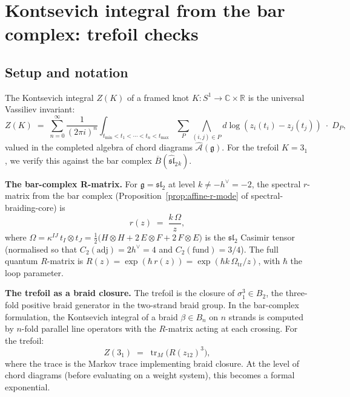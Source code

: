 \documentclass[11pt]{article}
\newcommand{\cA}{\mathcal{A}}
\newcommand{\fg}{\mathfrak{g}}
\newcommand{\fsl}{\mathfrak{sl}}
\newcommand{\barB}{\overline{B}}
\newcommand{\C}{\mathbb{C}}
\newcommand{\R}{\mathbb{R}}
\begin{document}
\section{Kontsevich integral from the bar complex: trefoil checks}
\label{sec:trefoil-verification}

\subsection{Setup and notation}

The Kontsevich integral $Z(K)$ of a framed knot $K : S^1 \to
\C \times \R$ is the universal Vassiliev invariant:
\begin{equation}\label{eq:kontsevich-trefoil}
  Z(K)
  \;=\;
  \sum_{n=0}^{\infty}
  \frac{1}{(2\pi i)^n}
  \int_{t_{\min} < t_1 < \cdots < t_n < t_{\max}}
  \sum_P
  \bigwedge_{(i,j) \in P}
  d\log(z_i(t_i) - z_j(t_j))
  \;\cdot\; D_P,
\end{equation}
valued in the completed algebra of chord diagrams
$\widehat{\cA}(\fg)$.  For the trefoil $K = 3_1$, we verify
this against the bar complex $\barB(\widehat{\fsl}_2{}_k)$.

\medskip
\noindent\textbf{The bar-complex R-matrix.}
For $\fg = \mathfrak{sl}_2$ at level $k \neq -h^\vee = -2$,
the spectral $r$-matrix from the bar complex
(Proposition~\ref{prop:affine-r-mode} of
spectral-braiding-core) is
\begin{equation}\label{eq:sl2-r-matrix}
  r(z) \;=\; \frac{k\,\Omega}{z},
\end{equation}
where
$\Omega = \kappa^{IJ}\, t_I \otimes t_J
= \frac{1}{2}\bigl(H \otimes H + 2\,E \otimes F
+ 2\,F \otimes E\bigr)$
is the $\mathfrak{sl}_2$ Casimir tensor
(normalised so that $C_2(\mathrm{adj}) = 2h^\vee = 4$
and $C_2(\mathrm{fund}) = 3/4$).
The full quantum $R$-matrix is
$R(z) = \exp(\hbar\, r(z)) = \exp(\hbar k\,\Omega_{\mathrm{tr}}/z)$,
with $\hbar$ the loop parameter.

\medskip
\noindent\textbf{The trefoil as a braid closure.}
The trefoil is the closure of $\sigma_1^3 \in B_2$, the
three-fold positive braid generator in the two-strand braid
group.  In the bar-complex formulation, the Kontsevich integral
of a braid $\beta \in B_n$ on $n$ strands is computed by
$n$-fold parallel line operators with the $R$-matrix acting at
each crossing.  For the trefoil:
\begin{equation}\label{eq:trefoil-braid}
  Z(3_1)
  \;=\;
  \operatorname{tr}_{M}\!\bigl(R(z_{12})^3\bigr),
\end{equation}
where the trace is the Markov trace implementing braid
closure.  At the level of chord diagrams (before evaluating on
a weight system), this becomes a formal exponential.
\end{document}
